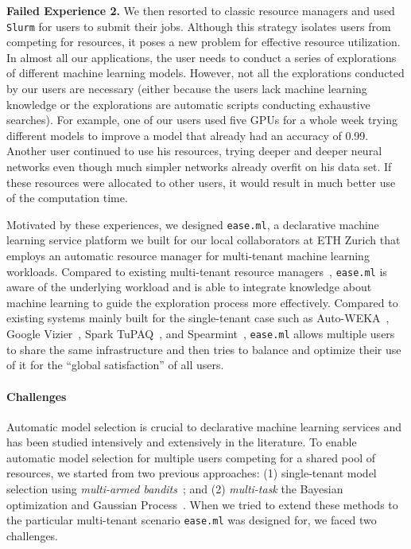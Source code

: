 \documentclass[letterpaper]{vldb}
\newcommand{\eml}{\texttt{ease.ml}\xspace}
\begin{document}
\vspace{0.1em}
\noindent
{\bf Failed Experience 2.} We then resorted to classic resource
managers and used \texttt{Slurm} for users to submit 
their jobs. 
Although this strategy isolates
users from competing for resources, it poses a
new problem for effective resource utilization.
In almost all our applications, the user needs to conduct 
a series of explorations of different machine learning
models.
However, not all the explorations conducted by
our users are necessary (either because the users lack
machine learning knowledge or the explorations are automatic 
scripts conducting exhaustive searches). For example,
one of our users used five GPUs for a whole week
trying different models to improve
a model that already had an accuracy of 0.99.
Another user 
continued to use his resources, trying deeper and 
deeper neural networks even though much simpler
networks already overfit on his data set.
If these resources were allocated to other users,
it would result in much better use of the computation time.

\vspace{0.1em}
Motivated by these experiences, we designed
\eml, a declarative machine learning service platform we built for our local collaborators at ETH Zurich
that employs an automatic resource manager for multi-tenant machine learning workloads.
Compared to existing multi-tenant 
resource managers~\cite{DavidShue2012,Krebs2014,JonathanMace2015}, \eml
is aware of the underlying workload and is able to
integrate knowledge about machine learning
to guide the exploration process more effectively.
Compared to existing systems mainly built for the
single-tenant case
such as Auto-WEKA~\cite{Thornton2013,Kotthoff2017}, 
Google Vizier~\cite{Golovin2017}, Spark TuPAQ~\cite{Sparks2015}, and Spearmint~\cite{Snoek2012}, \eml allows multiple users to share the same
infrastructure and then tries to balance and optimize their use of it for
the ``global satisfaction'' of all users.

\vspace{-0.5em}
\paragraph*{Challenges}

Automatic model selection is crucial to declarative machine learning services 
and has been studied intensively and extensively in the literature.
To enable automatic model selection for multiple users
competing for a shared pool of resources,
we started from two previous approaches:
(1) single-tenant model selection using 
\emph{multi-armed bandits}~\cite{Feurer2015,Snoek2012,Sparks2015,Golovin2017,Kotthoff2017};
and (2) {\em multi-task} the Bayesian optimization
and Gaussian Process~\cite{Hutter2011,Bardenet2013,Swersky2013}.
When we tried to extend these methods to the particular multi-tenant scenario \eml was designed for,
we faced two challenges.
\end{document}
